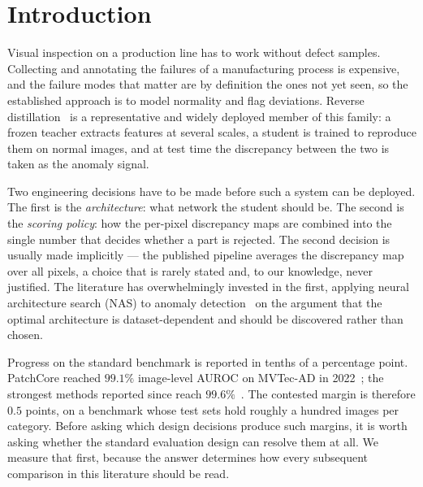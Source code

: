 %

\section{Introduction}
\label{sec:introduction}

Visual inspection on a production line has to work without defect samples.
Collecting and annotating the failures of a manufacturing process is expensive,
and the failure modes that matter are by definition the ones not yet seen, so the
established approach is to model normality and flag deviations. Reverse
distillation~\cite{deng2022reverse} is a representative and widely deployed member
of this family: a frozen teacher extracts features at several scales, a student is
trained to reproduce them on normal images, and at test time the discrepancy
between the two is taken as the anomaly signal.

Two engineering decisions have to be made before such a system can be deployed.
The first is the \emph{architecture}: what network the student should be. The
second is the \emph{scoring policy}: how the per-pixel discrepancy maps are
combined into the single number that decides whether a part is rejected. The
second decision is usually made implicitly --- the published pipeline averages the
discrepancy map over all pixels, a choice that is rarely stated and, to our
knowledge, never justified. The literature has overwhelmingly invested in the
first, applying neural architecture search (NAS) to anomaly
detection~\cite{liu2023simplenet,wang2021stpm} on the argument that the optimal
architecture is dataset-dependent and should be discovered rather than chosen.

 Progress on the standard benchmark is reported in tenths of a
percentage point. PatchCore reached $99.1\%$ image-level AUROC on MVTec-AD in
2022~\cite{roth2022patchcore}; the strongest methods reported since reach
$99.6\%$~\cite{liu2023simplenet,guo2025dinomaly}. The contested margin is
therefore $0.5$ points, on a benchmark whose test sets hold roughly a hundred
images per category. Before asking which design decisions produce such margins,
it is worth asking whether the standard evaluation design can resolve them at all.
We measure that first, because the answer determines how every subsequent
comparison in this literature should be read.

